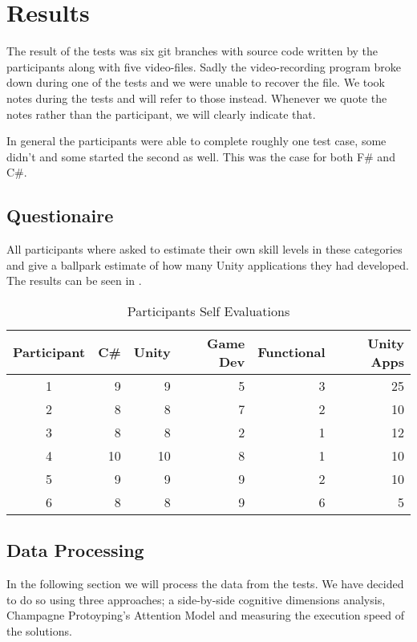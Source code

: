 \section{Results} \label{sec:test-results}
The result of the tests was six git branches with source code written by the participants along with five video-files. Sadly the video-recording program broke down during one of the tests and we were unable to recover the file. We took notes during the tests and will refer to those instead. Whenever we quote the notes rather than the participant, we will clearly indicate that.


In general the participants were able to complete roughly one test case, some didn't and some started the second as well. This was the case for both F\# and C\#.

\subsection{Questionaire}
All participants where asked to estimate their own skill levels in these categories and give a ballpark estimate of how many Unity applications they had developed. The results can be seen in .

\begin{table}[H]
\begin{tabular}{| c | r | r | r | r | r |}
	\hline
	\textbf{Participant}&\textbf{C\#}&\textbf{Unity}&\textbf{Game Dev}&\textbf{Functional}&\textbf{Unity Apps} \\ \hline
	1 & 9 & 9 & 5 & 3 & 25 \\ \hline
	2 & 8 & 8 & 7 & 2 & 10 \\ \hline
	3 & 8 & 8 & 2 & 1 & 12 \\ \hline
	4 & 10 & 10 & 8 & 1 & 10 \\ \hline
	5 & 9 & 9 & 9 & 2 & 10 \\ \hline
	6 & 8 & 8 & 9 & 6 & 5 \\ \hline
\end{tabular}
\caption{Participants Self Evaluations}
\label{tab:participant-scores}
\end{table}

\subsection{Data Processing}
In the following section we will process the data from the tests. We have decided to do so using three approaches; a side-by-side cognitive dimensions analysis, Champagne Protoyping's Attention Model and measuring the execution speed of the solutions.

